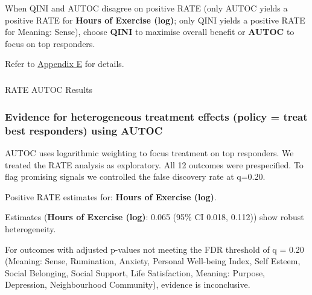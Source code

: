 \documentclass[
  single column]{article}
\makeatletter
\let\oldsubparagraph\subparagraph
\renewcommand{\subparagraph}{
    \@ifstar
      \xxxSubParagraphStar
      \xxxSubParagraphNoStar
  }
\newcommand{\xxxSubParagraphStar}[1]{\oldsubparagraph*{#1}\mbox{}}
\newcommand{\xxxSubParagraphNoStar}[1]{\oldsubparagraph{#1}\mbox{}}
\makeatother
\begin{document}
When QINI and AUTOC disagree on positive RATE (only AUTOC yields a
positive RATE for \textbf{Hours of Exercise (log)}; only QINI yields a
positive RATE for Meaning: Sense), choose \textbf{QINI} to maximise
overall benefit or \textbf{AUTOC} to focus on top responders.

Refer to \hyperref[appendix-cate-validation]{Appendix E} for details.

\subparagraph{RATE AUTOC Results}\label{rate-autoc-results}

\subsubsection{Evidence for heterogeneous treatment effects (policy =
treat best responders) using
AUTOC}\label{evidence-for-heterogeneous-treatment-effects-policy-treat-best-responders-using-autoc}

AUTOC uses logarithmic weighting to focus treatment on top responders.
We treated the RATE analysis as exploratory. All 12 outcomes were
prespecified. To flag promising signals we controlled the false
discovery rate at q=0.20.

Positive RATE estimates for: \textbf{Hours of Exercise (log)}.

Estimates (\textbf{Hours of Exercise (log)}: 0.065 (95\% CI 0.018,
0.112)) show robust heterogeneity.

For outcomes with adjusted p-values not meeting the FDR threshold of q =
0.20 (Meaning: Sense, Rumination, Anxiety, Personal Well-being Index,
Self Esteem, Social Belonging, Social Support, Life Satisfaction,
Meaning: Purpose, Depression, Neighbourhood Community), evidence is
inconclusive.
\end{document}
